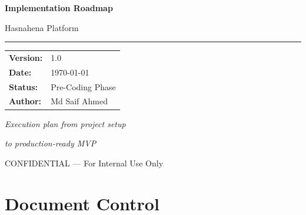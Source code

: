 \documentclass[11pt,a4paper]{article}
\newcommand{\DocumentTitle}{Implementation Roadmap}
\newcommand{\DocumentSubtitle}{Hasnahena Platform}
\newcommand{\DocumentVersion}{1.0}
\newcommand{\DocumentDate}{\today}
\begin{document}
\begin{titlepage}
    \centering
    \vspace*{2cm}
    
    {\Huge\bfseries\color{primaryblue}\DocumentTitle\par}
    \vspace{0.5cm}
    {\LARGE\color{darkgray}\DocumentSubtitle\par}
    
    \vspace{1.5cm}
    
    {\color{primaryblue}\rule{10cm}{2pt}\par}
    
    \vspace{2cm}
    
    \begin{tabular}{ll}
        \textbf{Version:} & \DocumentVersion \\[0.5em]
        \textbf{Date:} & \DocumentDate \\[0.5em]
        \textbf{Status:} & Pre-Coding Phase \\[0.5em]
        \textbf{Author:} & Md Saif Ahmed \\[0.5em]
    \end{tabular}
    
    \vfill
    
    {\large\color{darkgray}\textit{Execution plan from project setup}\par}
    {\large\color{darkgray}\textit{to production-ready MVP}\par}
    
    \vspace{1cm}
    
    {\footnotesize\color{darkgray}CONFIDENTIAL --- For Internal Use Only\par}
\end{titlepage}

\tableofcontents
\newpage

\section*{Document Control}
\end{document}
